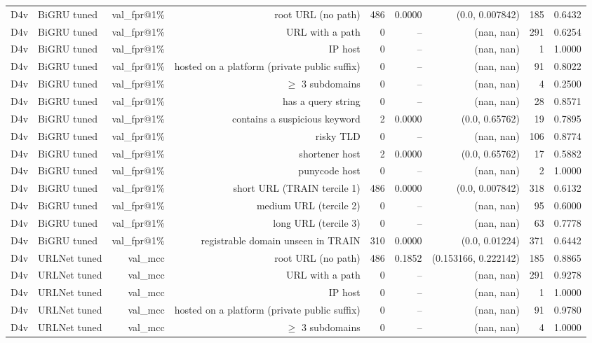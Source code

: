 \begin{table}[t]
\begin{tabular}{llrrrrrrr}
D4v & BiGRU tuned & val\_fpr@1\% & root URL (no path) & 486 & 0.0000 & (0.0, 0.007842) & 185 & 0.6432 \\
D4v & BiGRU tuned & val\_fpr@1\% & URL with a path & 0 & -- & (nan, nan) & 291 & 0.6254 \\
D4v & BiGRU tuned & val\_fpr@1\% & IP host & 0 & -- & (nan, nan) & 1 & 1.0000 \\
D4v & BiGRU tuned & val\_fpr@1\% & hosted on a platform (private public suffix) & 0 & -- & (nan, nan) & 91 & 0.8022 \\
D4v & BiGRU tuned & val\_fpr@1\% & $\geq$ 3 subdomains & 0 & -- & (nan, nan) & 4 & 0.2500 \\
D4v & BiGRU tuned & val\_fpr@1\% & has a query string & 0 & -- & (nan, nan) & 28 & 0.8571 \\
D4v & BiGRU tuned & val\_fpr@1\% & contains a suspicious keyword & 2 & 0.0000 & (0.0, 0.65762) & 19 & 0.7895 \\
D4v & BiGRU tuned & val\_fpr@1\% & risky TLD & 0 & -- & (nan, nan) & 106 & 0.8774 \\
D4v & BiGRU tuned & val\_fpr@1\% & shortener host & 2 & 0.0000 & (0.0, 0.65762) & 17 & 0.5882 \\
D4v & BiGRU tuned & val\_fpr@1\% & punycode host & 0 & -- & (nan, nan) & 2 & 1.0000 \\
D4v & BiGRU tuned & val\_fpr@1\% & short URL (TRAIN tercile 1) & 486 & 0.0000 & (0.0, 0.007842) & 318 & 0.6132 \\
D4v & BiGRU tuned & val\_fpr@1\% & medium URL (tercile 2) & 0 & -- & (nan, nan) & 95 & 0.6000 \\
D4v & BiGRU tuned & val\_fpr@1\% & long URL (tercile 3) & 0 & -- & (nan, nan) & 63 & 0.7778 \\
D4v & BiGRU tuned & val\_fpr@1\% & registrable domain unseen in TRAIN & 310 & 0.0000 & (0.0, 0.01224) & 371 & 0.6442 \\
D4v & URLNet tuned & val\_mcc & root URL (no path) & 486 & 0.1852 & (0.153166, 0.222142) & 185 & 0.8865 \\
D4v & URLNet tuned & val\_mcc & URL with a path & 0 & -- & (nan, nan) & 291 & 0.9278 \\
D4v & URLNet tuned & val\_mcc & IP host & 0 & -- & (nan, nan) & 1 & 1.0000 \\
D4v & URLNet tuned & val\_mcc & hosted on a platform (private public suffix) & 0 & -- & (nan, nan) & 91 & 0.9780 \\
D4v & URLNet tuned & val\_mcc & $\geq$ 3 subdomains & 0 & -- & (nan, nan) & 4 & 1.0000 \\

\end{tabular}
\end{table}
